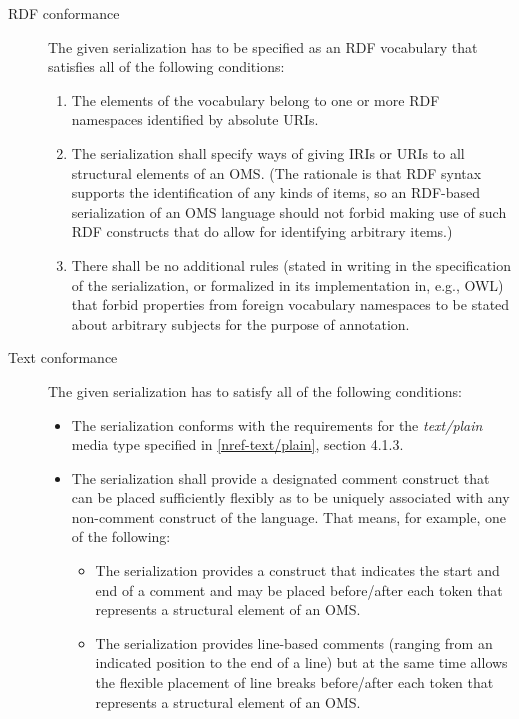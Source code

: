 \documentclass[10pt, a4paper]{isov2}
\makeatletter
\newcommand*{\eg}{e.g.,\@\xspace}
\newcommand*\CommentAuthor{}
\renewcommand*\CommentAuthor{#1}}
\newcommand*\CommentDate{}
\renewcommand*\CommentDate{#1}}
\newcommand*\CommentId{}
\renewcommand*\CommentId{#1}}
\newcommand*\CommentType{}
\renewcommand*\CommentType{#1}}
\newcommand*{\SetCommentColorByType}[1]{%
\edef\localType{{#1}}%
\expandafter\ifstrequal\localType{q-aut}{\colorlet{CommentColor}{red}}{%
\expandafter\ifstrequal\localType{q-all}{\colorlet{CommentColor}{orange}}{%
\expandafter\ifstrequal\localType{todo}{\colorlet{CommentColor}{orange}}{%
\expandafter\ifstrequal\localType{fyi}{\colorlet{CommentColor}{lightgray}}{%
\colorlet{CommentColor}{yellow}}}}}}
\newcommand*{\SetCommentPrefixByType}[1]{%
\edef\localType{{#1}}%
\expandafter\@ifmtarg\localType{%
\edef\CommentPrefix{}%
}{%
\caseupper[q]{#1}%
\edef\CommentPrefix{\thestring: }%
}}
\newcommand*{\initComment}[1]{%
\setkeys{Comment}{#1}%
\SetCommentColorByType{\CommentType}%
\relax%
\SetCommentPrefixByType{\CommentType}%
\relax%
}
\newcommand*{\todonote}[2][]{%
\initComment{#1}%
\pdfcomment[author=\CommentAuthor,color=CommentColor,date=\CommentDate,id=\CommentId]{%
\CommentPrefix
#2}}
\renewcommand*{\todonote}[2][]{%
\initComment{#1}%
\ednote{\CommentPrefix #2}}
\newcommand*{\mimetype}[1]{\textit{#1}}
\renewcommand{\noterefname}{note}
\renewcommand{\nref}[1]{\noterefname~\ref{#1}}
\renewcommand{\nref}[1]{\ref{nref-#1}}
\makeatother
\begin{document}
\begin{description}
\item[RDF conformance]
The given serialization has to be specified as an RDF vocabulary that
 satisfies all of the following conditions:
\begin{enumerate}
\item The elements of the vocabulary belong to one or more RDF namespaces
 identified by absolute URIs.
\item\label{it:ids-for-structure} The serialization shall specify ways of giving IRIs or URIs to all structural elements of an OMS. (The  rationale is that RDF syntax supports the identification of any kinds of items, so an RDF-based serialization of an OMS language should not forbid making use of such RDF constructs that do allow for identifying arbitrary items.)
\item There shall be no additional rules (stated in writing in the specification of the serialization, or formalized in its implementation in, e.g., OWL) that forbid properties from foreign vocabulary namespaces to be stated about arbitrary subjects for the purpose of annotation.
\end{enumerate}



\item[Text conformance]
The given serialization has to satisfy all of the following conditions:
\begin{itemize}
\item The serialization conforms with the requirements for the \mimetype{text/plain} media type specified in \nref{text/plain}, section 4.1.3.
\item The serialization shall provide a designated comment construct that can be placed sufficiently flexibly as to be uniquely associated with any non-comment construct of the language.  That means, for example, one of the following:
  \begin{itemize}
  \item The serialization provides a construct that indicates the start and end of a comment and may be placed before/after each token that represents a structural element of an OMS.
  \item The serialization provides line-based comments (ranging from an indicated position to the end of a line) but at the same time allows the flexible placement of line breaks before/after each token that represents a structural element of an OMS.
  \end{itemize}
\end{itemize}


\end{description}
\end{document}

